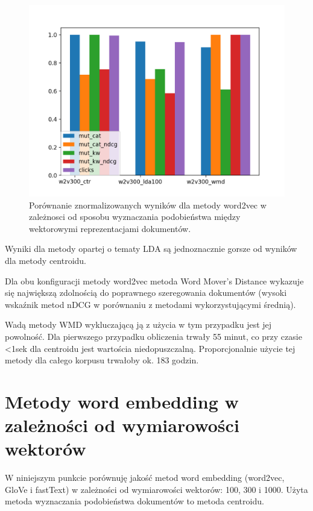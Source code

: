 \documentclass[pl]{minipw} %
\begin{document}
\begin{figure}[H]
	\centering
	\includegraphics[width=1\textwidth]{img/results/w2v300_ctr_w2v300_lda100_w2v300_wmd_.png}
	\caption{Porównanie znormalizowanych wyników dla metody word2vec w zależnosci od sposobu wyznaczania podobieństwa między wektorowymi reprezentacjami dokumentów.}
\end{figure}

Wyniki dla metody opartej o tematy LDA są jednoznacznie gorsze od wyników dla metody centroidu.

Dla obu konfiguracji metody word2vec metoda Word Mover's Distance wykazuje się największą zdolnością do poprawnego szeregowania dokumentów (wysoki wskaźnik metod nDCG w porównaniu z metodami wykorzystującymi średnią).

Wadą metody WMD wykluczającą ją z użycia w tym przypadku jest jej powolność. Dla pierwszego przypadku  obliczenia trwały 55 minut, co przy czasie <1sek dla centroidu jest wartościa niedopuszczalną. Proporcjonalnie użycie tej metody dla całego korpusu trwałoby ok. 183 godzin.


\section{Metody word embedding w zależności od wymiarowości wektorów}

W niniejszym punkcie porównuję jakość metod word embedding (word2vec, GloVe i fastText) w zależności od wymiarowości wektorów: 100, 300 i 1000. Użyta metoda wyznaczania podobieństwa dokumentów to metoda centroidu.
\end{document}
